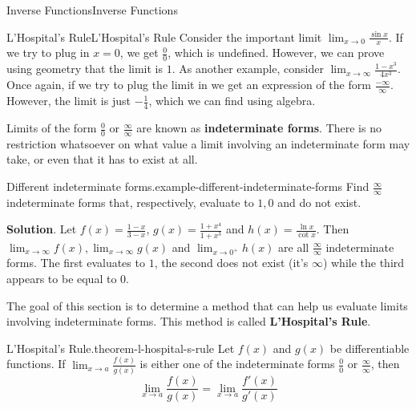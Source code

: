 \documentclass[10pt,]{book}
\newcommand{\terminology}[1]{\textbf{#1}}
\numberwithin{equation}{section}
\begin{document}
\begin{chapterptx}{Inverse Functions}{}{Inverse Functions}{}{}
%
%
\typeout{************************************************}
\typeout{************************************************}
%
\begin{sectionptx}{L'Hospital's Rule}{}{L'Hospital's Rule}{}{}\label{section-l-hospital-s-rule}
\hypertarget{p-282}{}%
Consider the important limit \(\lim_{x\to0}\frac{\sin x}{x}\). If we try to plug in \(x=0\), we get \(\frac{0}{0}\), which is undefined. However, we can prove using geometry that the limit is \(1\). As another example, consider \(\lim_{x\to\infty}\frac{1-x^{3}}{4x^{3}}\). Once again, if we try to plug the limit in we get an expression of the form \(\frac{-\infty}{\infty}\). However, the limit is just \(-\frac{1}{4}\), which we can find using algebra.%
\par
\hypertarget{p-283}{}%
Limits of the form \(\frac{0}{0}\) or \(\frac{\infty}{\infty}\) are known as \terminology{indeterminate forms}. There is no restriction whatsoever on what value a limit involving an indeterminate form may take, or even that it has to exist at all.%
\begin{example}{Different indeterminate forms.}{example-different-indeterminate-forms}%
\hypertarget{p-284}{}%
Find \(\frac{\infty}{\infty}\) indeterminate forms that, respectively, evaluate to \(1, 0\) and do not exist.%
\par\smallskip%
\noindent\textbf{Solution}.\hypertarget{solution-62}{}\quad%
\hypertarget{p-285}{}%
Let \(f(x) = \frac{1-x}{3-x}\), \(g(x) = \frac{1+x^{4}}{1+x^{3}}\) and \(h(x) = \frac{\ln x}{\cot x}\). Then \(\lim_{x\to\infty}f(x), \lim_{x\to\infty}g(x)\) and \(\lim_{x\to0^{+}}h(x)\) are all \(\frac{\infty}{\infty}\) indeterminate forms. The first evaluates to \(1\), the second does not exist (it's \(\infty\)) while the third appears to be equal to \(0\).%
\end{example}
\hypertarget{p-286}{}%
The goal of this section is to determine a method that can help us evaluate limits involving indeterminate forms. This method is called \terminology{L'Hospital's Rule}.%
\begin{theorem}{L'Hospital's Rule.}{}{theorem-l-hospital-s-rule}%
\hypertarget{p-287}{}%
Let \(f(x)\) and \(g(x)\) be differentiable functions. If \(\lim_{x\to a}\frac{f(x)}{g(x)}\) is either one of the indeterminate forms \(\frac{0}{0}\) or \(\frac{\infty}{\infty}\), then%
\begin{equation*}
\lim_{x\to a}\frac{f(x)}{g(x)} = \lim_{x\to a}\frac{f'(x)}{g'(x)}
\end{equation*}

\end{theorem}
\end{sectionptx}
\end{chapterptx}
\end{document}
